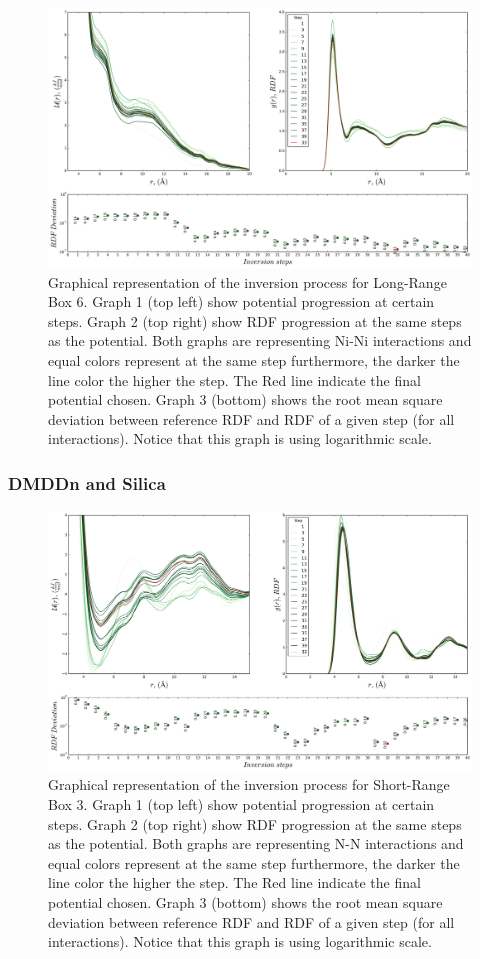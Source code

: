 \documentclass[10pt,a4paper,twoside]{article}
\begin{document}
\begin{figure}[H]
  \begin{center}
	\includegraphics[width=.8 \textwidth]{./graphs/Conv100sN}
	\caption{\small{Graphical representation of the inversion process for Long-Range Box 6. Graph 1 (top left) show potential progression at certain steps. Graph 2 (top right) show RDF progression at the same steps as the potential. Both graphs are representing Ni-Ni interactions and equal colors represent at the same step furthermore, the darker the line color the higher the step. The Red line indicate the final potential chosen.  Graph 3 (bottom) shows the root mean square deviation between reference RDF and RDF of a given step (for all interactions). Notice that this graph is using logarithmic scale.}}
	\label{Fig:Conv100sN}
  \end{center}
\end{figure}
\subsubsection{DMDDn and Silica}

\begin{figure}[H]
  \begin{center}
	\includegraphics[width=.8 \textwidth]{./graphs/Conv30n}
	\caption{\small{Graphical representation of the inversion process for Short-Range Box 3. Graph 1 (top left) show potential progression at certain steps. Graph 2 (top right) show RDF progression at the same steps as the potential. Both graphs are representing N-N interactions and equal colors represent at the same step furthermore, the darker the line color the higher the step. The Red line indicate the final potential chosen.  Graph 3 (bottom) shows the root mean square deviation between reference RDF and RDF of a given step (for all interactions). Notice that this graph is using logarithmic scale.}}
	\label{Fig:Conv30n}
  \end{center}
\end{figure}
\end{document}
